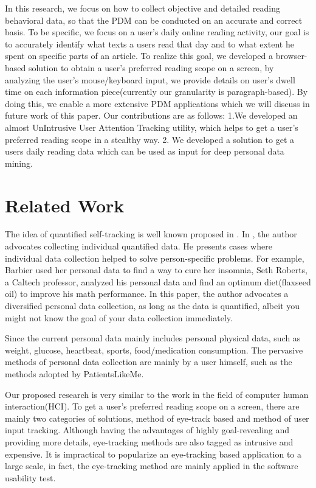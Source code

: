 \documentclass{sigchi}
\begin{document}
In this research, we focus on how to collect objective and detailed reading behavioral data, so that the PDM can be conducted on an accurate and correct basis. To be specific, we focus on a user’s daily online reading activity, our goal is to accurately identify what texts a users read that day and to what extent he spent on specific parts of an article. To realize this goal, we developed a browser-based solution to obtain a user’s preferred reading scope on a screen, by analyzing the user’s mouse/keyboard input, we provide details on user’s dwell time on each information piece(currently our granularity is paragraph-based). By doing this, we enable a more extensive PDM applications which we will discuss in future work of this paper. Our contributions are as follows: 1.We developed an almost UnIntrusive User Attention Tracking utility, which helps to get a user’s preferred reading scope in a stealthy way. 2. We developed  a solution to get a users daily reading data which can be used as input for deep personal data mining. 


\section{Related Work}

The idea of quantified self-tracking is well known proposed in \cite{wolf2010data}. In \cite{wolf2010data}, the author advocates collecting individual quantified data. He presents cases where individual data collection helped to solve person-specific problems. For example, Barbier used her personal data to find a way to cure her insomnia\cite{wolf2010data},  Seth Roberts, a Caltech professor, analyzed his personal data and find an optimum diet(flaxseed oil) to improve his math performance\cite{wolf2010data}. In this paper, the author advocates a diversified personal data collection, as long as the data is quantified, albeit you might not know the goal of your data collection immediately. 


Since the current personal data mainly includes personal physical data, such as weight, glucose, heartbeat, sports, food/medication consumption. The pervasive methods of personal data collection are mainly by a user himself, such as the methods adopted by PatientsLikeMe\cite{plm}. 


	Our proposed research is very similar to the work in the field of computer human interaction(HCI). To get a user’s preferred reading scope on a screen, there are mainly two categories of solutions, method of eye-track based and method of user input tracking.  
Although having the advantages of highly goal-revealing and providing more details, eye-tracking\cite{jacob2003eye} methods are also tagged as intrusive and expensive. It is impractical to popularize an eye-tracking based application to a large scale, in fact, the eye-tracking method are mainly applied in the software usability test. 
\end{document}
